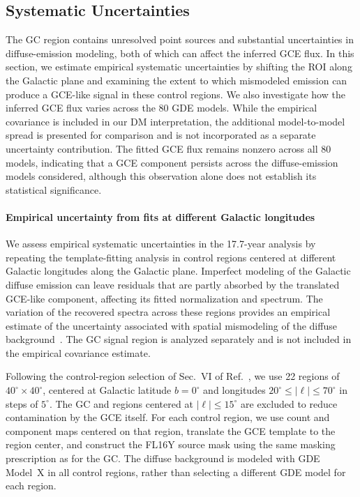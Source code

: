 \documentclass[superscriptaddress,
showpacs,preprintnumbers,nofootinbib,eqsecnum,amsmath,amssymb,aps,11pt, groupedaddress, floatfix]{revtex4-2}
\begin{document}
\subsection{Systematic Uncertainties}
The GC region contains unresolved point sources and substantial uncertainties in diffuse-emission modeling, both of which can affect the inferred GCE flux. In this section, we estimate empirical systematic uncertainties by shifting the ROI along the Galactic plane and examining the extent to which mismodeled emission can produce a GCE-like signal in these control regions. We also investigate how the inferred GCE flux varies across the 80 GDE models. While the empirical covariance is included in our DM interpretation, the additional model-to-model spread is presented for comparison and is not incorporated as a separate uncertainty contribution. The fitted GCE flux remains nonzero across all 80 models, indicating that a GCE component persists across the diffuse-emission models considered, although this observation alone does not establish its statistical significance.

%
\paragraph{Empirical uncertainty from fits at different Galactic longitudes}
We assess empirical systematic uncertainties in the 17.7-year analysis
by repeating the template-fitting analysis in control regions centered
at different Galactic longitudes along the Galactic plane.
Imperfect modeling of the Galactic diffuse emission can leave residuals
that are partly absorbed by the translated GCE-like component, affecting
its fitted normalization and spectrum. The variation of the recovered
spectra across these regions provides an empirical estimate of the
uncertainty associated with spatial mismodeling of the diffuse
background~\cite{Calore:2014xka,Cholis:2021rpp}.
The GC signal region is analyzed separately and is not included in the
empirical covariance estimate.

Following the control-region selection of Sec.~VI of
Ref.~\cite{Cholis:2021rpp}, we use 22 regions of
$40^\circ\times40^\circ$, centered at Galactic latitude $b=0^\circ$
and longitudes $20^\circ\leq|\ell|\leq70^\circ$ in steps of $5^\circ$.
The GC and regions centered at $|\ell|\leq15^\circ$ are excluded
to reduce contamination by the GCE itself.
For each control region, we use count and component maps centered on
that region, translate the GCE template to the region center, and
construct the FL16Y source mask using the same masking prescription
as for the GC. The diffuse background is modeled with GDE Model~X
in all control regions, rather than selecting a different GDE model
for each region.
\end{document}
